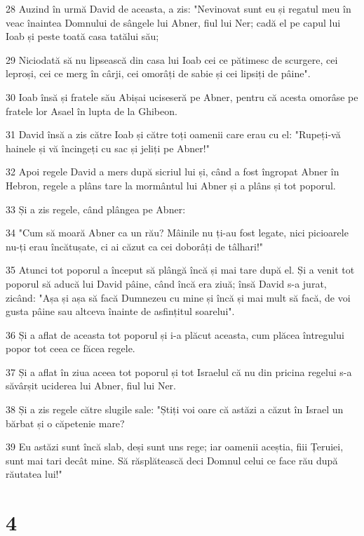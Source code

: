\par 28 Auzind în urmă David de aceasta, a zis: "Nevinovat sunt eu și regatul meu în veac înaintea Domnului de sângele lui Abner, fiul lui Ner; cadă el pe capul lui Ioab și peste toată casa tatălui său;
\par 29 Niciodată să nu lipsească din casa lui Ioab cei ce pătimesc de scurgere, cei leproși, cei ce merg în cârji, cei omorâți de sabie și cei lipsiți de pâine".
\par 30 Ioab însă și fratele său Abișai uciseseră pe Abner, pentru că acesta omorâse pe fratele lor Asael în lupta de la Ghibeon.
\par 31 David însă a zis către Ioab și către toți oamenii care erau cu el: "Rupeți-vă hainele și vă încingeți cu sac și jeliți pe Abner!"
\par 32 Apoi regele David a mers după sicriul lui și, când a fost îngropat Abner în Hebron, regele a plâns tare la mormântul lui Abner și a plâns și tot poporul.
\par 33 Și a zis regele, când plângea pe Abner:
\par 34 "Cum să moară Abner ca un rău? Mâinile nu ți-au fost legate, nici picioarele nu-ți erau încătușate, ci ai căzut ca cei doborâți de tâlhari!"
\par 35 Atunci tot poporul a început să plângă încă și mai tare după el. Și a venit tot poporul să aducă lui David pâine, când încă era ziuă; însă David s-a jurat, zicând: "Așa și așa să facă Dumnezeu cu mine și încă și mai mult să facă, de voi gusta pâine sau altceva înainte de asfințitul soarelui".
\par 36 Și a aflat de aceasta tot poporul și i-a plăcut aceasta, cum plăcea întregului popor tot ceea ce făcea regele.
\par 37 Și a aflat în ziua aceea tot poporul și tot Israelul că nu din pricina regelui s-a săvârșit uciderea lui Abner, fiul lui Ner.
\par 38 Și a zis regele către slugile sale: "Știți voi oare că astăzi a căzut în Israel un bărbat și o căpetenie mare?
\par 39 Eu astăzi sunt încă slab, deși sunt uns rege; iar oamenii aceștia, fiii Țeruiei, sunt mai tari decât mine. Să răsplătească deci Domnul celui ce face rău după răutatea lui!"

\chapter{4}

